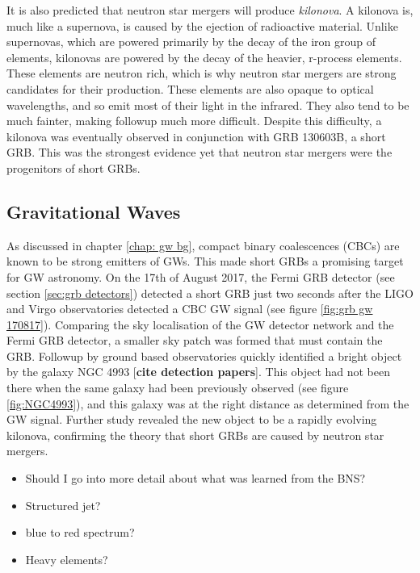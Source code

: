 \documentclass[11pt]{cuthesis}
\begin{document}
It is also predicted that neutron star mergers will produce \textit{kilonova}. A kilonova is, much like a supernova, is caused by the ejection of radioactive material. Unlike supernovas, which are powered primarily by the decay of the iron group of elements, kilonovas are powered by the decay of the heavier, r-process elements. These elements are neutron rich, which is why neutron star mergers are strong candidates for their production. These elements are also opaque to optical wavelengths, and so emit most of their light in the infrared. They also tend to be much fainter, making followup much more difficult. Despite this difficulty, a kilonova was eventually observed in conjunction with GRB 130603B, a short GRB. This was the strongest evidence yet that neutron star mergers were the progenitors of short GRBs.

\subsection{Gravitational Waves}
As discussed in chapter \ref{chap: gw bg}, compact binary coalescences (CBCs) are known to be strong emitters of GWs. This made short GRBs a promising target for GW astronomy. On the 17th of August 2017, the Fermi GRB detector (see section \ref{sec:grb detectors}) detected a short GRB just two seconds after the LIGO and Virgo observatories detected a CBC GW signal (see figure \ref{fig:grb gw 170817}). Comparing the sky localisation of the GW detector network and the Fermi GRB detector, a smaller sky patch was formed that must contain the GRB. Followup by ground based observatories quickly identified a bright object by the galaxy NGC 4993 [\textbf{cite detection papers}]. This object had not been there when the same galaxy had been previously observed (see figure \ref{fig:NGC4993}), and this galaxy was at the right distance as determined from the GW signal. Further study revealed the new object to be a rapidly evolving kilonova, confirming the theory that short GRBs are caused by neutron star mergers. 

\begin{itemize}
\item Should I go into more detail about what was learned from the BNS?
\item Structured jet?
\item blue to red spectrum?
\item Heavy elements? 
\end{itemize}
\end{document}
